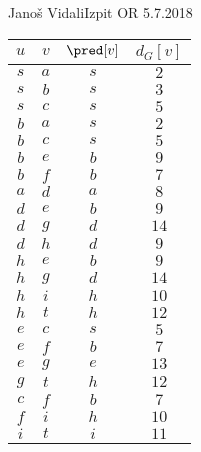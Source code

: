 \begin{naloga}{Janoš Vidali}{Izpit OR 5.7.2018}
\begin{odgovor}
\begin{enumerate}[(a)]
\begin{tabela}
\begin{tabular}{cc|cc}
$u$ & $v$ & $\pred[v]$ & $d_G[v]$ \\ \hline
$ s$ & $a$ & $s$ & $2$ \\
$ s$ & $b$ & $s$ & $3$ \\
$ s$ & $c$ & $s$ & $5$ \\
$ b$ & $a$ & $s$ & $2$ \\
$ b$ & $c$ & $s$ & $5$ \\
$ b$ & $e$ & $b$ & $9$ \\
$ b$ & $f$ & $b$ & $7$ \\
$ a$ & $d$ & $a$ & $8$ \\
$ d$ & $e$ & $b$ & $9$ \\
$ d$ & $g$ & $d$ & $14$ \\
$ d$ & $h$ & $d$ & $9$ \\
$ h$ & $e$ & $b$ & $9$ \\
$ h$ & $g$ & $d$ & $14$ \\
$ h$ & $i$ & $h$ & $10$ \\
$ h$ & $t$ & $h$ & $12$ \\
$ e$ & $c$ & $s$ & $5$ \\
$ e$ & $f$ & $b$ & $7$ \\
$ e$ & $g$ & $e$ & $13$ \\
$ g$ & $t$ & $h$ & $12$ \\
$ c$ & $f$ & $b$ & $7$ \\
$ f$ & $i$ & $h$ & $10$ \\
$ i$ & $t$ & $i$ & $11$ \\
\end{tabular}
\end{tabela}


\end{enumerate}
\end{odgovor}
\end{naloga}
